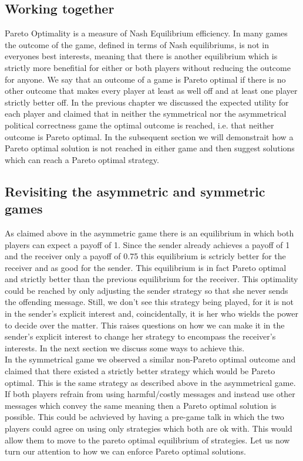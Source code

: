 \documentclass{article}
\begin{document}
\subsection{Working together}
Pareto Optimality is a measure of Nash Equilibrium efficiency. In many games the outcome of the game, defined in terms of Nash equilibriums, is not in everyones best interests, meaning that there is another equilibrium which is strictly more benefitial for either or both players without reducing the outcome for anyone. We say that an outcome of a game is Pareto optimal if there is no other outcome that makes every player at least as well off and at least one player strictly better off. In the previous chapter we discussed the expected utility for each player and claimed that in neither the symmetrical nor the asymmetrical political correctness game the optimal outcome is reached, i.e. that neither outcome is Pareto optimal. In the subsequent section we will demonstrait how a Pareto optimal solution is not reached in either game and then suggest solutions which can reach a Pareto optimal strategy.
\subsection{Revisiting the asymmetric and symmetric games}
As claimed above in the asymmetric game there is an equilibrium in which both players can expect a payoff of 1. Since the sender already achieves a payoff of 1 and the receiver only a payoff of 0.75 this equilibrium is sctricly better for the receiver and as good for the sender. This equilibrium is in fact Pareto optimal and strictly better than the previous equilibrium for the receiver. This optimality could be reached by only adjusting the sender strategy so that she never sends the offending message. Still, we don't see this strategy being played, for it is not in the sender's explicit interest and, coincidentally, it is her who wields the power to decide over the matter. This raises questions on how we can make it in the sender's explicit interest to change her strategy to encompass the receiver's interests. In the next section we discuss some ways to achieve this.\\
In the symmetrical game we observed a similar non-Pareto optimal outcome and claimed that there existed a strictly better strategy which would be Pareto optimal. This is the same strategy as described above in the asymmetrical game. If both players refrain from using harmful/costly messages and instead use other messages which convey the same meaning then a Pareto optimal solution is possible. This could be achvieved by having a pre-game talk in which the two players could agree on using only strategies which both are ok with. This would allow them to move to the pareto optimal equilibrium of strategies. Let us now turn our attention to how we can enforce Pareto optimal solutions.
\end{document}
